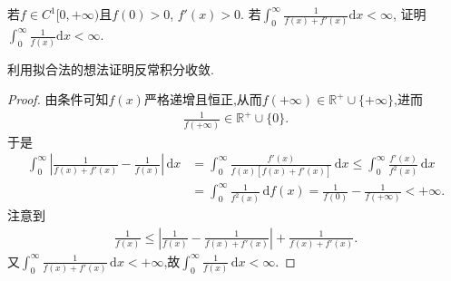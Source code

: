 \documentclass[../../main.tex]{subfiles}%
\begin{document}
\begin{example}
若$f \in C^1[0, +\infty)$且$f(0) > 0$, $f'(x) > 0$. 若$\int_0^{\infty} \frac{1}{f(x) + f'(x)} \mathrm{d}x < \infty$, 证明$\int_0^{\infty} \frac{1}{f(x)} \mathrm{d}x < \infty$.
\end{example}
\begin{note}
利用拟合法的想法证明反常积分收敛.
\end{note}
\begin{proof}
由条件可知$f(x)$严格递增且恒正,从而$f(+\infty) \in \mathbb{R}^+ \cup \{+\infty\}$,进而
\begin{align*}
\frac{1}{f(+\infty)} \in \mathbb{R}^+ \cup \{0\}.
\end{align*}
于是
\begin{align*}
\int_0^{\infty} \left| \frac{1}{f(x) + f'(x)} - \frac{1}{f(x)} \right| \, \mathrm{d}x &= \int_0^{\infty} \frac{f'(x)}{f(x) \left[ f(x) + f'(x) \right]} \, \mathrm{d}x \leqslant \int_0^{\infty} \frac{f'(x)}{f^2(x)} \, \mathrm{d}x \\
&= \int_0^{\infty} \frac{1}{f^2(x)} \, \mathrm{d}f(x) = \frac{1}{f(0)} - \frac{1}{f(+\infty)} < +\infty.
\end{align*}
注意到
\begin{align*}
\frac{1}{f(x)} \leqslant \left| \frac{1}{f(x)} - \frac{1}{f(x) + f'(x)} \right| + \frac{1}{f(x) + f'(x)}.
\end{align*}
又$\int_0^{\infty} \frac{1}{f(x) + f'(x)} \, \mathrm{d}x < +\infty$,故$\int_0^{\infty} \frac{1}{f(x)} \, \mathrm{d}x < \infty$.
\end{proof}
\end{document}
